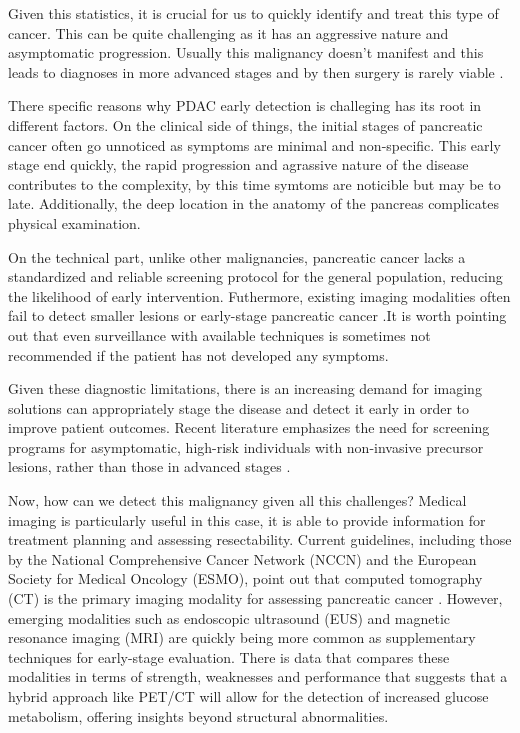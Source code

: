 \documentclass[11pt]{article} %
\begin{document}
Given this statistics, it is crucial for us to quickly identify and treat this type of cancer. This can be quite challenging as it has an aggressive nature and asymptomatic progression. Usually this malignancy doesn't manifest and this leads to diagnoses in more advanced stages and by then surgery is rarely viable \cite{Pubmed30721664}.

There specific reasons why PDAC early detection is challeging has its root in different factors. On the clinical side of things, the initial stages of pancreatic cancer often go unnoticed as symptoms are minimal and non-specific. This early stage end quickly, the rapid progression and agrassive nature of the disease contributes to the complexity, by this time symtoms are noticible but may be to late.   Additionally, the deep location in the anatomy of the pancreas complicates physical examination. 

On the technical part, unlike other malignancies, pancreatic cancer lacks a standardized and reliable screening protocol for the general population, reducing the likelihood of early intervention. Futhermore, existing imaging modalities often fail to detect smaller lesions or early-stage pancreatic cancer \cite{Pubmed30721664}.It is worth pointing out that even surveillance with available techniques is sometimes not recommended if the patient has not developed any symptoms.

Given these diagnostic limitations, there is an increasing demand for imaging solutions can appropriately stage the disease and detect it early in order to improve patient outcomes. Recent literature emphasizes the need for screening programs for asymptomatic, high-risk individuals with non-invasive precursor lesions, rather than those in advanced stages \cite{Cancers2023}.




Now, how can we detect this malignancy given all this challenges? Medical imaging is particularly useful in this case, it is able to provide information for treatment planning and assessing resectability. Current guidelines, including those by the National Comprehensive Cancer Network (NCCN) and the European Society for Medical Oncology (ESMO), point out that computed tomography (CT) is the primary imaging modality for assessing pancreatic cancer \cite{NCCNGuidelines}. However, emerging modalities such as endoscopic ultrasound (EUS) and magnetic resonance imaging (MRI) are quickly being more common as supplementary techniques for early-stage evaluation. There is data that compares these modalities in terms of strength, weaknesses and performance that suggests that a hybrid approach like PET/CT will allow for the detection of increased glucose metabolism, offering insights beyond structural abnormalities. \cite{life13102044}
\end{document}
